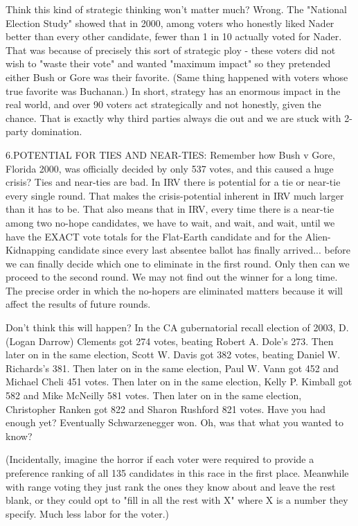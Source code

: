 Think this kind of strategic thinking won't matter much?  Wrong.
The "National Election Study" showed that in 2000, among voters who honestly liked
Nader better than every other candidate, fewer than 1 in 10 actually voted
for Nader.  That was because of precisely this sort of strategic ploy - these
voters did not wish to "waste their vote" and wanted "maximum impact"
so they pretended either Bush or Gore was their favorite. (Same thing happened
with voters whose true favorite was Buchanan.)  In short, strategy
has an enormous impact in the real world, and over 90%
voters act strategically and not honestly, given the chance.
That is exactly why third parties always die out and we are stuck with 2-party domination.

6.POTENTIAL FOR TIES AND NEAR-TIES:
Remember how Bush v Gore, Florida 2000, was officially decided by only 537 votes,
and this caused a huge crisis?  Ties and near-ties are bad.  In IRV
there is potential for a tie or near-tie every single round.  That makes
the crisis-potential inherent in IRV much larger than it has to be.  That also
means that in IRV, every time there is a near-tie among two no-hope
candidates, we have to wait, and wait, and wait, until we have the EXACT vote
totals for the Flat-Earth candidate and for the Alien-Kidnapping candidate 
since every last absentee ballot has finally arrived...
before we can finally decide which one to eliminate in the first round.
Only then can we proceed to the second round.  We may not find out the winner
for a long time.  The precise order in which the no-hopers are eliminated matters
because it will affect the results of future rounds.

Don't think this will happen?  In the CA gubernatorial recall election of 2003,
  D. (Logan Darrow) Clements   got  274  votes, beating   Robert A. Dole's  273.
Then later on in the same election,
  Scott W. Davis               got  382 votes, beating    Daniel W. Richards's 381.
Then later on in the same election,
  Paul W. Vann        got 452 and   Michael Cheli 451 votes.
Then later on in the same election,
   Kelly P. Kimball  got  582  and  Mike McNeilly  581 votes.
Then later on in the same election,
  Christopher Ranken got  822  and  Sharon Rushford 821 votes.
Have you had enough yet?    Eventually Schwarzenegger won.  
Oh, was that what you wanted to know?

(Incidentally, imagine the horror if each voter were required to provide a preference ranking
of all 135 candidates in this race in the first place.  Meanwhile with range voting they
just rank the ones they know about and leave the rest blank, or they could
opt to "fill in all the rest with X" where X is a number they specify.  Much
less labor for the voter.)

